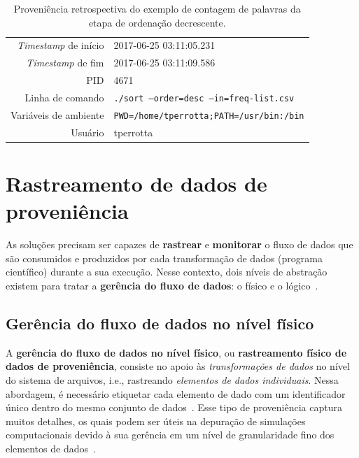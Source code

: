 \begin{table}[htb]
    \centering
    \begin{tabular}{r|l}
        \hline
        \textit{Timestamp} de início & 2017-06-25 03:11:05.231                         \\
        \textit{Timestamp} de fim    & 2017-06-25 03:11:09.586                         \\
        PID                          & 4671                                            \\
        Linha de comando             & \texttt{./sort --order=desc --in=freq-list.csv} \\
        Variáveis de ambiente        & \texttt{PWD=/home/tperrotta;PATH=/usr/bin:/bin} \\
        Usuário                      & tperrotta                                       \\
        \hline
    \end{tabular}
    \caption[Proveniência retrospectiva do exemplo de contagem de palavras]{Proveniência retrospectiva do exemplo de contagem de palavras da etapa de ordenação decrescente.}%
    \label{tab:word-count-retrospective}
\end{table}

\section{Rastreamento de dados de proveniência}

As soluções precisam ser capazes de \textbf{rastrear} e \textbf{monitorar} o fluxo de dados que são consumidos e produzidos por cada transformação de dados (programa científico) durante a sua execução. Nesse contexto, dois níveis de abstração existem para tratar a \textbf{gerência do fluxo de dados}: o físico e o lógico~\cite{silva2015propostadoutorado}.

\subsection{Gerência do fluxo de dados no nível físico}%
\label{sec:gerencia-do-fluxo-de-dados-no-nivel-fisico}

A \textbf{gerência do fluxo de dados no nível físico}, ou \textbf{rastreamento físico de dados de proveniência}, consiste no apoio às \emph{transformações de dados} no nível do sistema de arquivos, i.e., rastreando \emph{elementos de dados individuais}. Nessa abordagem, é necessário etiquetar cada elemento de dado com um identificador único dentro do mesmo conjunto de dados~\cite{silva2015propostadoutorado}. Esse tipo de proveniência captura muitos detalhes, os quais podem ser úteis na depuração de simulações computacionais devido à sua gerência em um nível de granularidade fino dos elementos de dados~\cite{silva2017raw}.

